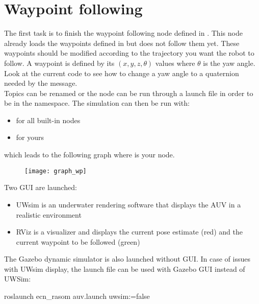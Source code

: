 \documentclass{ecnreport}
\begin{document}
%

\section{Waypoint following}

The first task is to finish the waypoint following node defined in . This node already loads the waypoints defined in  but does not follow them yet.
These waypoints should be modified according to the trajectory you want the robot to follow. A waypoint is defined by its $(x,y,z,\theta)$ values where $\theta$ is the yaw angle. Look at the current
code to see how to change a yaw angle to a quaternion needed by the  message.\\

Topics can be renamed or the node can be run through a launch file in order to be in the  namespace.
The simulation can then be run with:
\begin{itemize}
 \item {} for all built-in nodes
 \item {} for yours
\end{itemize}
which leads to the following graph where  is your node.
\begin{figure}[h]\centering
 \texttt{[image: graph\_wp]}
\end{figure}

Two GUI are launched: 
\begin{itemize}
 \item UWsim is an underwater rendering software that displays the AUV in a realistic environment
 \item RViz is a visualizer and displays the current pose estimate (red) and the current waypoint to be followed (green)
\end{itemize}
The Gazebo dynamic simulator is also launched without GUI. In case of issues with UWsim display, the launch file can be used with Gazebo GUI instead of UWSim:
\begin{bashcodelarge}
roslaunch ecn_rasom auv.launch uwsim:=false
  \end{bashcodelarge}
\end{document}
